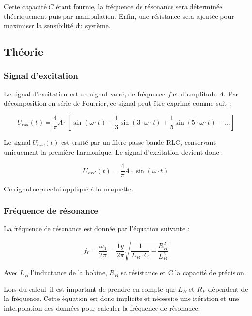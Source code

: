 Cette capacité $C$ étant fournie, la fréquence de résonance sera déterminée théoriquement puis par
manipulation. Enfin, une résistance sera ajoutée pour maximiser la sensibilité du système. 



\subsection{Théorie}
\subsubsection{Signal d'excitation}
Le signal d'excitation est un signal carré, de fréquence $f$ et d'amplitude $A$. Par décomposition
en série de Fourrier, ce signal peut être exprimé comme suit :

\begin{equation*}
U_{exc}(t) = \frac{4}{\pi} A \cdot [\sin(\omega \cdot t)+\frac{1}{3}\sin(3\cdot\omega \cdot t)+\frac{1}{5}\sin(5\cdot\omega \cdot t)+...]     
\end{equation*}
\vspace{0,2cm}

Le signal $U_{exc}(t)$ est traité par un filtre passe-bande RLC, conservant uniquement la première
harmonique. Le signal d'excitation devient donc :

\begin{equation*}
    U_{exc'}(t) = \frac{4}{\pi} A \cdot \sin(\omega \cdot t)
\end{equation*}

Ce signal sera celui appliqué à la maquette.

\subsubsection{Fréquence de résonance}

La fréquence de résonance est donnée par l'équation suivante :

\begin{equation}
    f_0 = \frac{\omega_0}{2\pi} = \frac{1y}{2\pi}\sqrt{\frac{1}{L_B\cdot C}-\frac{R_B^2}{L_B^2}}
    \label{eq:freq_res}
\end{equation}

Avec $L_B$ l'inductance de la bobine, $R_B$ sa résistance et C la capacité de précision.
\vspace{0,2cm}

Lors du calcul, il est important de prendre en compte que $L_B$ et $R_B$ dépendent de la fréquence.
Cette équation est donc implicite et nécessite une itération et une interpolation des données pour
calculer la fréquence de résonance.


